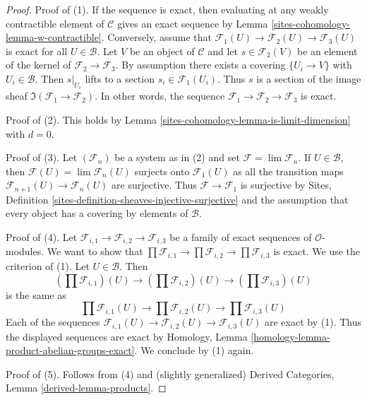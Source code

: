 \begin{proof}
Proof of (1). If the sequence is exact, then evaluating at any
weakly contractible element of $\mathcal{C}$ gives an exact
sequence by Lemma \ref{sites-cohomology-lemma-w-contractible}. Conversely, assume that
$\mathcal{F}_1(U) \to \mathcal{F}_2(U) \to \mathcal{F}_3(U)$
is exact for all $U \in \mathcal{B}$.
Let $V$ be an object of $\mathcal{C}$ and let
$s \in \mathcal{F}_2(V)$ be an element of the kernel of
$\mathcal{F}_2 \to \mathcal{F}_3$. By assumption there exists
a covering $\{U_i \to V\}$ with $U_i \in \mathcal{B}$.
Then $s|_{U_i}$ lifts to a section $s_i \in \mathcal{F}_1(U_i)$.
Thus $s$ is a section of the image sheaf
$\Im(\mathcal{F}_1 \to \mathcal{F}_2)$.
In other words, the sequence
$\mathcal{F}_1 \to \mathcal{F}_2 \to \mathcal{F}_3$
is exact.

\medskip\noindent
Proof of (2). This holds by Lemma \ref{sites-cohomology-lemma-is-limit-dimension} with $d = 0$.

\medskip\noindent
Proof of (3). Let $(\mathcal{F}_n)$ be a system as in (2) and set
$\mathcal{F} = \lim \mathcal{F}_n$. If $U \in \mathcal{B}$, then
$\mathcal{F}(U) = \lim \mathcal{F}_n(U)$
surjects onto $\mathcal{F}_1(U)$ as all the transition maps
$\mathcal{F}_{n + 1}(U) \to \mathcal{F}_n(U)$ are surjective.
Thus $\mathcal{F} \to \mathcal{F}_1$ is surjective by
Sites, Definition \ref{sites-definition-sheaves-injective-surjective}
and the assumption that every object
has a covering by elements of $\mathcal{B}$.

\medskip\noindent
Proof of (4). Let
$\mathcal{F}_{i, 1} \to \mathcal{F}_{i, 2} \to \mathcal{F}_{i, 3}$
be a family of exact sequences of $\mathcal{O}$-modules.
We want to show that
$\prod \mathcal{F}_{i, 1} \to \prod \mathcal{F}_{i, 2} \to
\prod \mathcal{F}_{i, 3}$ is exact. We use the criterion of (1).
Let $U \in \mathcal{B}$. Then
$$
(\prod \mathcal{F}_{i, 1})(U) \to
(\prod \mathcal{F}_{i, 2})(U) \to
(\prod \mathcal{F}_{i, 3})(U)
$$
is the same as
$$
\prod \mathcal{F}_{i, 1}(U) \to
\prod \mathcal{F}_{i, 2}(U) \to
\prod \mathcal{F}_{i, 3}(U)
$$
Each of the sequences
$\mathcal{F}_{i, 1}(U) \to \mathcal{F}_{i, 2}(U) \to \mathcal{F}_{i, 3}(U)$
are exact by (1). Thus the displayed sequences are exact by
Homology, Lemma \ref{homology-lemma-product-abelian-groups-exact}.
We conclude by (1) again.

\medskip\noindent
Proof of (5). Follows from (4) and (slightly generalized)
Derived Categories, Lemma \ref{derived-lemma-products}.


\end{proof}
